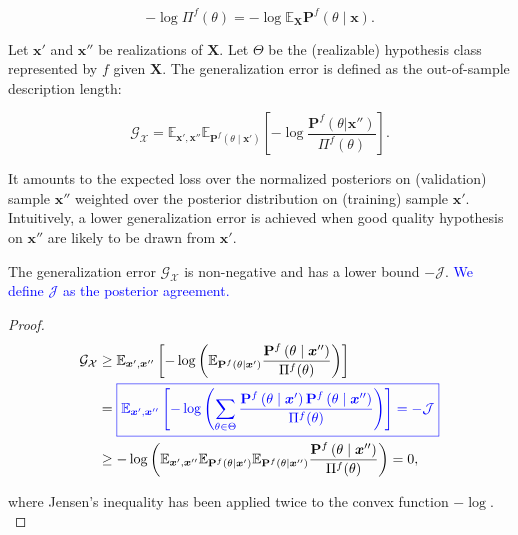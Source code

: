 $$
    - \log \Pi^f (\theta) = - \log \mathbb{E}_{\bm{X}} \mathbf{P}^f (\theta \mid \bm{x}).
$$

\begin{definition}
    Let $\bm{x'}$ and $\bm{x''}$ be realizations of $\bm{X}$.
    Let $\Theta$ be the (realizable) hypothesis class represented by $f$ given $\bm{X}$. 
    The generalization error is defined as the out-of-sample description length:

    $$
        \mathcal{G}_{\mathcal{X}} = \mathbb{E}_{\bm{x}', \bm{x}''} \mathbb{E}_{\mathbf{P}^f( \theta \mid \bm{x}')} \left[ - \log \frac{\mathbf{P}^f(\theta | \bm{x}'')}{\Pi^f (\theta)} \right].
    $$
    
\end{definition}

It amounts to the expected loss over the normalized posteriors on (validation) sample
$\bm{x}''$ weighted over the posterior distribution on (training) sample $\bm{x}'$.
Intuitively, a lower generalization error is achieved when good quality hypothesis
on $\bm{x}''$ are likely to be drawn from $\bm{x}'$. 


\begin{lemma}\label{lemma:pa}
    The generalization error $\mathcal{G}_{\mathcal{X}}$ is non-negative and has a lower bound $-\mathcal{J}$. 
    \textcolor{blue}{We define $\mathcal{J}$ as the posterior agreement.}
\end{lemma}
\begin{proof}
    $$
    \begin{aligned}
        \mathcal{G}_{\mathcal{X}} & \geq \mathbb{E}_{\bm{x}', \bm{x}''}\left[-\log \left(\mathbb{E}_{\mathbf{P}^f( \theta \mid \bm{x}')} \frac{\mathbf{P}^{f}\left(\theta \mid \bm{x}''\right)}{\Pi^{f}(\theta)}\right)\right] \\
        & = \textcolor{blue}{\boxed{\mathbb{E}_{\bm{x}', \bm{x}''} \left[-\log \left(\sum_{\theta \in \Theta} \frac{\mathbf{P}^{f}\left(\theta \mid \bm{x}'\right) \mathbf{P}^{f}\left(\theta \mid \bm{x}'' \right)}{\Pi^{f}(\theta)}\right)\right] = -\mathcal{J}}} \\
        & \geq-\log \left(\mathbb{E}_{\bm{x}', \bm{x}''} \mathbb{E}_{\mathbf{P}^f( \theta \mid \bm{x}')} \mathbb{E}_{\mathbf{P}^f(\theta \mid \bm{x}'')} \frac{\mathbf{P}^{f}\left(\theta \mid \bm{x}''\right)}{\Pi^{f}(\theta)}\right)=0,
    \end{aligned}
    $$

where Jensen's inequality has been applied twice to the convex function $-\log$. \\

\end{proof}

